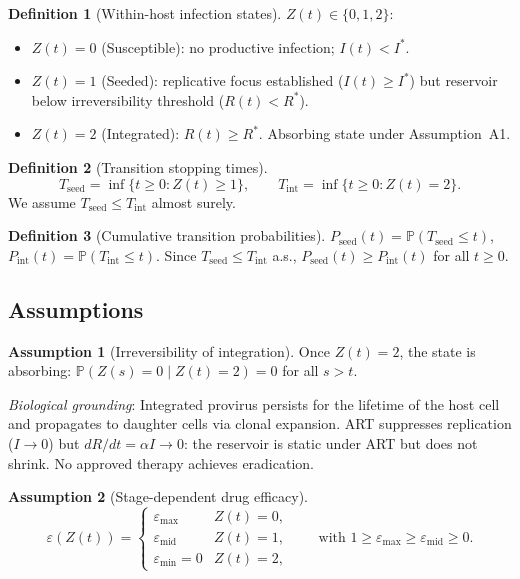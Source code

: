 \documentclass[11pt]{article}
\theoremstyle{definition}
\newtheorem{definition}{Definition}[section]
\newtheorem{assumption}{Assumption}[section]
\theoremstyle{remark}
\newcommand{\Tseed}{T_{\text{seed}}}
\newcommand{\Tint}{T_{\text{int}}}
\newcommand{\Pseed}{P_{\text{seed}}}
\newcommand{\Pint}{P_{\text{int}}}
\newcommand{\emax}{\varepsilon_{\max}}
\newcommand{\emid}{\varepsilon_{\text{mid}}}
\newcommand{\emin}{\varepsilon_{\min}}
\begin{document}
\begin{definition}[Within-host infection states]
$Z(t) \in \{0, 1, 2\}$:
\begin{itemize}[nosep,leftmargin=2em]
    \item $Z(t) = 0$ (Susceptible): no productive infection; $I(t) < I^{*}$.
    \item $Z(t) = 1$ (Seeded): replicative focus established ($I(t) \geq I^{*}$) but reservoir below irreversibility threshold ($R(t) < R^{*}$).
    \item $Z(t) = 2$ (Integrated): $R(t) \geq R^{*}$. Absorbing state under Assumption~A1.
\end{itemize}
\end{definition}

\begin{definition}[Transition stopping times]
\[
\Tseed = \inf\{t \geq 0 : Z(t) \geq 1\}, \qquad
\Tint  = \inf\{t \geq 0 : Z(t) = 2\}.
\]
We assume $\Tseed \leq \Tint$ almost surely.
\end{definition}

\begin{definition}[Cumulative transition probabilities]
$\Pseed(t) = \mathbb{P}(\Tseed \leq t)$, $\Pint(t) = \mathbb{P}(\Tint \leq t)$. Since $\Tseed \leq \Tint$ a.s., $\Pseed(t) \geq \Pint(t)$ for all $t \geq 0$.
\end{definition}

\subsection{Assumptions}

\begin{assumption}[Irreversibility of integration]
Once $Z(t) = 2$, the state is absorbing: $\mathbb{P}(Z(s) = 0 \mid Z(t) = 2) = 0$ for all $s > t$.

\textit{Biological grounding}: Integrated provirus persists for the lifetime of the host cell and propagates to daughter cells via clonal expansion. ART suppresses replication ($I \to 0$) but $dR/dt = \alpha I \to 0$: the reservoir is static under ART but does not shrink. No approved therapy achieves eradication.
\end{assumption}

\begin{assumption}[Stage-dependent drug efficacy]
\[
\varepsilon(Z(t)) =
\begin{cases}
\emax & Z(t) = 0,\\
\emid & Z(t) = 1,\\
\emin = 0 & Z(t) = 2,
\end{cases}
\qquad
\text{with } 1 \geq \emax \geq \emid \geq 0.
\]
\end{assumption}
\end{document}
